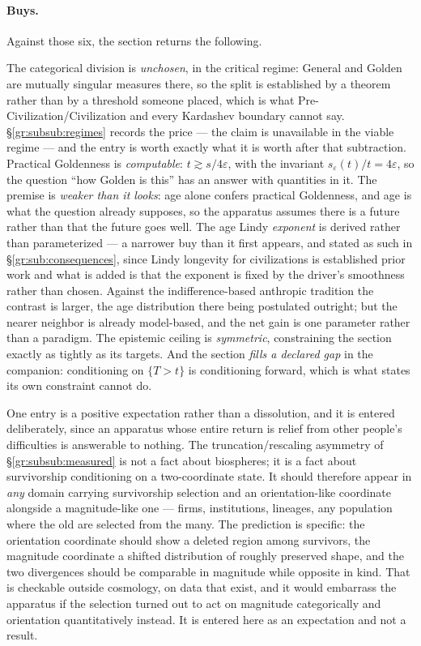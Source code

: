 \documentclass[11pt]{article}
\numberwithin{equation}{section}
\theoremstyle{plain}
\theoremstyle{definition}
\theoremstyle{remark}
\begin{document}
\paragraph{Buys.} Against those six, the section returns the following.

The categorical division is \emph{unchosen}, in the critical regime:
General and Golden are mutually singular measures there, so the split is
established by a theorem rather than by a threshold someone placed,
which is what Pre-Civilization/Civilization and every Kardashev boundary
cannot say. \S\ref{gr:subsub:regimes} records the price --- the claim is
unavailable in the viable regime --- and the entry is worth exactly what
it is worth after that subtraction.
Practical Goldenness is \emph{computable}: $t \gtrsim s/4\varepsilon$,
with the invariant $s_\varepsilon(t)/t = 4\varepsilon$, so the question
``how Golden is this'' has an answer with quantities in it. The premise
is \emph{weaker than it looks}: age alone confers practical Goldenness,
and age is what the question already supposes, so the apparatus assumes
there is a future rather than that the future goes well. The age
Lindy \emph{exponent} is derived rather than parameterized --- a
narrower buy than it first appears, and stated as such in
\S\ref{gr:sub:consequences}, since Lindy longevity for civilizations is
established prior work \cite{BC21,BG24,Kip20,Ord23} and what is added is
that the exponent is fixed by the driver's smoothness rather than
chosen. Against the indifference-based anthropic tradition
\cite{Car83,Got93,Bos02} the contrast is larger, the age distribution
there being postulated outright; but the nearer neighbor is already
model-based, and the net gain is one parameter rather than a
paradigm.
The epistemic ceiling is \emph{symmetric}, constraining the section
exactly as tightly as its targets. And the section \emph{fills a
declared gap} in the companion: conditioning on $\{T>t\}$ is
conditioning forward, which is what \cite{Ben26Optimal} states its own
constraint cannot do.

One entry is a positive expectation rather than a dissolution, and it is
entered deliberately, since an apparatus whose entire return is relief
from other people's difficulties is answerable to nothing. The
truncation/rescaling asymmetry of \S\ref{gr:subsub:measured} is not a
fact about biospheres; it is a fact about survivorship conditioning on a
two-coordinate state. It should therefore appear in \emph{any} domain
carrying survivorship selection and an orientation-like coordinate
alongside a magnitude-like one --- firms, institutions, lineages, any
population where the old are selected from the many. The prediction is
specific: the orientation coordinate should show a deleted region among
survivors, the magnitude coordinate a shifted distribution of roughly
preserved shape, and the two divergences should be comparable in
magnitude while opposite in kind. That is checkable outside cosmology,
on data that exist, and it would embarrass the apparatus if the
selection turned out to act on magnitude categorically and orientation
quantitatively instead. It is entered here as an expectation and not a
result.
\end{document}

